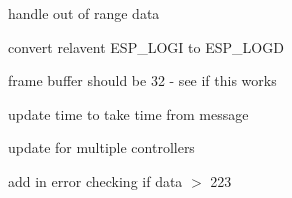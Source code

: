 
\begin{DoxyRefList}
\item[Member \mbox{\hyperlink{main_8cpp_a955ad07241382211a8efdeaa2307443a}{Handle\+NMEA2000\+Msg}} (const t\+N2k\+Msg \&N2k\+Msg)]\label{todo__todo000005}%
%
handle out of range data  
\item[File \mbox{\hyperlink{main_8cpp}{main.cpp}} ]\label{todo__todo000001}%
%
convert relavent ESP\+\_\+\+LOGI to ESP\+\_\+\+LOGD  
\item[Member \mbox{\hyperlink{main_8cpp_abcaa9f46955f9eaa3af477ed9e5c9d53}{N2\+K\+\_\+task}} (void $\ast$pv\+Parameters)]\label{todo__todo000004}%
%
frame buffer should be 32 -\/ see if this works  
\item[Member \mbox{\hyperlink{main_8cpp_ac894d2ff5b41ee9ca73d7adb560d9416}{Send\+N2k\+Msg}} ()]\label{todo__todo000003}%
%
update time to take time from message 

update for multiple controllers 
\item[Member \mbox{\hyperlink{main_8cpp_a09ae4e0a7dffdbfb9a499ce4874a5778}{vector\+To\+Char\+Array}} (const std\+::vector$<$ uint8\+\_\+t $>$ \&data\+\_\+vec, unsigned char(\&data\+\_\+char\+\_\+arr)\mbox{[}223\mbox{]})]\label{todo__todo000002}%
%
add in error checking if data $>$ 223 
\end{DoxyRefList}